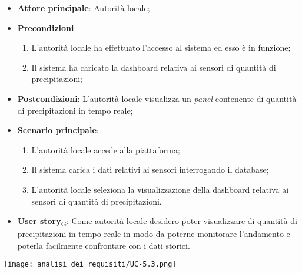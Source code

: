\begin{itemize}
	\item \textbf{Attore principale}: Autorità locale;
	\item \textbf{Precondizioni}:
	      \begin{enumerate}
		      \item L'autorità locale ha effettuato l'accesso al sistema ed esso è in funzione;
		      \item Il sistema ha caricato la dashboard relativa ai sensori di quantità di precipitazioni;
	      \end{enumerate}
	\item \textbf{Postcondizioni}: L'autorità locale visualizza un \textit{panel} contenente di quantità di precipitazioni in tempo reale;
	\item \textbf{Scenario principale}:
	      \begin{enumerate}
		      \item L'autorità locale accede alla piattaforma;
		      \item Il sistema carica i dati relativi ai sensori interrogando il database;
		      \item L'autorità locale seleziona la visualizzazione della dashboard relativa ai sensori di quantità di precipitazioni.
	      \end{enumerate}
	\item \href{https://7last.github.io/docs/rtb/documentazione-interna/glossario\#user-story}{\textbf{User story}\textsubscript{G}}:
	      Come autorità locale desidero poter visualizzare di quantità di precipitazioni in tempo reale in modo da poterne monitorare l'andamento
	      e poterla facilmente confrontare con i dati storici.
\end{itemize}
\begin{center}
	\texttt{[image: analisi\_dei\_requisiti/UC-5.3.png]}
\end{center}


